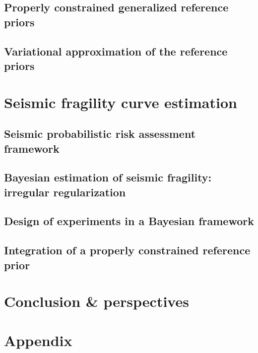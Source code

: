 \documentclass[a4paper]{book}
\renewcommand{\familydefault}{\sfdefault}
\begin{document}



\chapter{Properly constrained generalized reference priors}




\chapter{Variational approximation of the reference priors}




\part{Seismic fragility curve estimation}


\chapter{Seismic probabilistic risk assessment framework}



\chapter{Bayesian estimation of seismic fragility: irregular regularization}


\chapter{Design of experiments in a Bayesian framework}


\chapter{Integration of a properly constrained reference prior}




\part{Conclusion \& perspectives}



\part*{Appendix}






\renewcommand{\familydefault}{\sfdefault}

\end{document}
